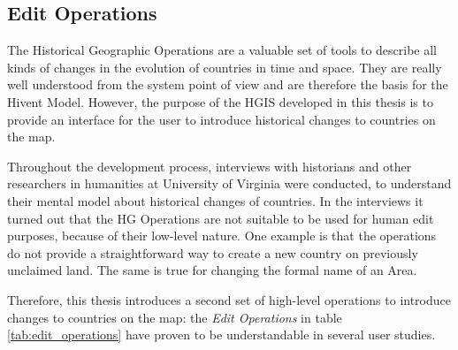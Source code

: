 

\subsection{Edit Operations} %
\label{sub:edit_operations}

The Historical Geographic Operations are a valuable set of tools to describe all kinds of changes in the evolution of countries in time and space. They are really well understood from the system point of view and are therefore the basis for the Hivent Model. However, the purpose of the HGIS developed in this thesis is to provide an interface for the user to introduce historical changes to countries on the map.

Throughout the development process, interviews with historians and other researchers in humanities at University of Virginia were conducted, to understand their mental model about historical changes of countries. In the interviews it turned out that the HG Operations are not suitable to be used for human edit purposes, because of their low-level nature. One example is that the operations do not provide a straightforward way to create a new country on previously unclaimed land. The same is true for changing the formal name of an Area.

Therefore, this thesis introduces a second set of high-level operations to introduce changes to countries on the map: the \emph{Edit Operations} in table \ref{tab:edit_operations} have proven to be understandable in several user studies.

